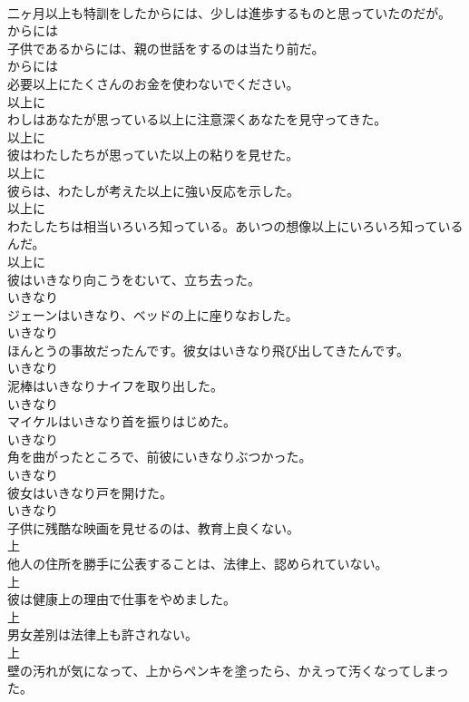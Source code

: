 \documentclass[8pt]{extreport}
\begin{document}
\begin{CJK}{UTF8}{min}
\\	二ヶ月以上も特訓をしたからには、少しは進歩するものと思っていたのだが。	
\\	からには
\\	子供であるからには、親の世話をするのは当たり前だ。	
\\	からには
\\	必要以上にたくさんのお金を使わないでください。	
\\	以上に
\\	わしはあなたが思っている以上に注意深くあなたを見守ってきた。	
\\	以上に
\\	彼はわたしたちが思っていた以上の粘りを見せた。	
\\	以上に
\\	彼らは、わたしが考えた以上に強い反応を示した。	
\\	以上に
\\	わたしたちは相当いろいろ知っている。あいつの想像以上にいろいろ知っているんだ。	
\\	以上に
\\	彼はいきなり向こうをむいて、立ち去った。	
\\	いきなり
\\	ジェーンはいきなり、ベッドの上に座りなおした。	
\\	いきなり
\\	ほんとうの事故だったんです。彼女はいきなり飛び出してきたんです。	
\\	いきなり
\\	泥棒はいきなりナイフを取り出した。	
\\	いきなり
\\	マイケルはいきなり首を振りはじめた。	
\\	いきなり
\\	角を曲がったところで、前彼にいきなりぶつかった。	
\\	いきなり
\\	彼女はいきなり戸を開けた。	
\\	いきなり
\\	子供に残酷な映画を見せるのは、教育上良くない。	
\\	上
\\	他人の住所を勝手に公表することは、法律上、認められていない。	
\\	上
\\	彼は健康上の理由で仕事をやめました。	
\\	上
\\	男女差別は法律上も許されない。	
\\	上
\\	壁の汚れが気になって、上からペンキを塗ったら、かえって汚くなってしまった。	

\end{CJK}
\end{document}
